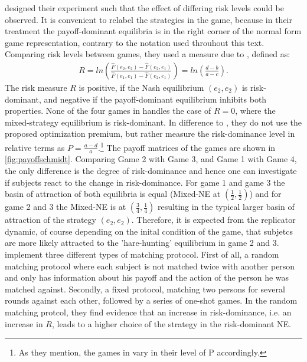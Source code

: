 \documentclass[11pt]{article}
\begin{document}
\textcite{schmidt_playing_2003} designed their experiment such that the effect
of differing risk levels could be observed. It is convenient to relabel 
the strategies in the game, because in their treatment the payoff-dominant 
equilibria is in the right corner of the normal form game representation,
contrary to the notation used throuhout this text. Comparing risk levels between
games, they used a measure due to \textcite{selten_axiomatic_1995}, defined
as:
\begin{align}
        \label{riskmeasureschmidt}
        R = ln\left(\frac{\hat{F}(e_2,e_2) -\hat{F}(e_2,e_1)}{\hat{F}(e_1,e_1) 
        -\hat{F}(e_2,e_1)}\right) = ln \left(\frac{d-b}{a-c}\right).
\end{align}
The risk measure $R$ is positive, if the Nash equilibrium $(e_2,e_2)$ is
risk-dominant, and negative if the payoff-dominant equilibrium inhibits both
properties.
None of the four games in \textcite{schmidt_playing_2003} handles
the case of $R=0$, where the mixed-strategy equilibrium is risk-dominant.
In difference to \textcite{battalio_optimization_2001}, they do not
use the proposed optimization premium, but rather measure the risk-dominance 
level in relative terms as $P=\frac{a-d}{a}$.\footnote{As they mention, the 
games in \textcite{battalio_optimization_2001} vary in their level of 
P accordingly.}
The payoff matrices of the games are shown in \ref{fig:payoffschmidt}.
Comparing Game 2 with Game 3, and Game 1 with Game 4, the only difference is the 
degree of risk-dominance and hence one can investigate if subjects react 
to the change in risk-dominance. For game 1 and game 3 the basin of attraction
of both equilibria is equal (Mixed-NE at $(\frac 12, \frac 12)$) and  for
game 2 and 3 the Mixed-NE is at $(\frac 34,\frac 14)$ resulting in the typical 
larger basin of attraction of the strategy $(e_2,e_2)$. Therefore, it is  
expected from the replicator dynamic, of course depending on the inital condition 
of the game, that subjetcs are more likely attracted to the 'hare-hunting' 
equilibrium in game 2 and 3.
\textcite{schmidt_playing_2003} implement three different types of matching
protocol. First of all, a random matching protocol where each subject is not
matched twice with another person and only has information about his payoff and
the action of the person he was matched against. 
Secondly, a fixed protocol, matching two persons for several rounds against 
each other, followed by a series of one-shot games. 
In the random matching protcol, they find evidence that an increase in 
risk-dominance, i.e. an increase in $R$, leads to a higher choice of the
strategy in the risk-dominant NE. 
\end{document}

